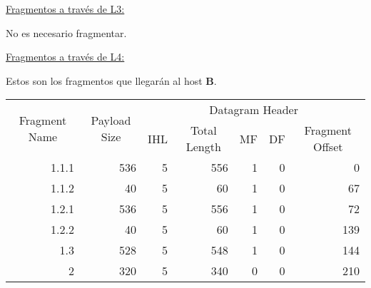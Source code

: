 \noindent
\underline{Fragmentos a través de L3:}

\vspace{\baselineskip}
No es necesario fragmentar.

\skipline\noindent
\underline{Fragmentos a través de L4:}

\skipline
Estos son los fragmentos que llegarán al host \textbf{B}.

\begin{table}[H]
    \renewcommand{\arraystretch}{1.5}
    \centering
    \begin{tabular}{|r|r|rrrrr|}
    \hline
    \multicolumn{1}{|c|}{\multirow{2}{*}{Fragment Name}} & \multicolumn{1}{c|}{\multirow{2}{*}{Payload Size}} & \multicolumn{5}{c|}{Datagram Header} \\ \cline{3-7} 
    \multicolumn{1}{|c|}{} & \multicolumn{1}{c|}{} & \multicolumn{1}{c|}{IHL} & \multicolumn{1}{c|}{Total Length} & \multicolumn{1}{c|}{MF} & \multicolumn{1}{c|}{DF} & \multicolumn{1}{c|}{Fragment Offset} \\ \hline
    1.1.1 & 536 & \multicolumn{1}{r|}{5} & \multicolumn{1}{r|}{556} & \multicolumn{1}{r|}{1} & \multicolumn{1}{r|}{0} & 0 \\ \hline
    1.1.2 & 40 & \multicolumn{1}{r|}{5} & \multicolumn{1}{r|}{60} & \multicolumn{1}{r|}{1} & \multicolumn{1}{r|}{0} & 67 \\ \hline
    1.2.1 & 536 & \multicolumn{1}{r|}{5} & \multicolumn{1}{r|}{556} & \multicolumn{1}{r|}{1} & \multicolumn{1}{r|}{0} & 72 \\ \hline
    1.2.2 & 40 & \multicolumn{1}{r|}{5} & \multicolumn{1}{r|}{60} & \multicolumn{1}{r|}{1} & \multicolumn{1}{r|}{0} & 139 \\ \hline
    1.3 & 528 & \multicolumn{1}{r|}{5} & \multicolumn{1}{r|}{548} & \multicolumn{1}{r|}{1} & \multicolumn{1}{r|}{0} & 144 \\ \hline
    2 & 320 & \multicolumn{1}{r|}{5} & \multicolumn{1}{r|}{340} & \multicolumn{1}{r|}{0} & \multicolumn{1}{r|}{0} & 210 \\ \hline
    \end{tabular}
\end{table}
